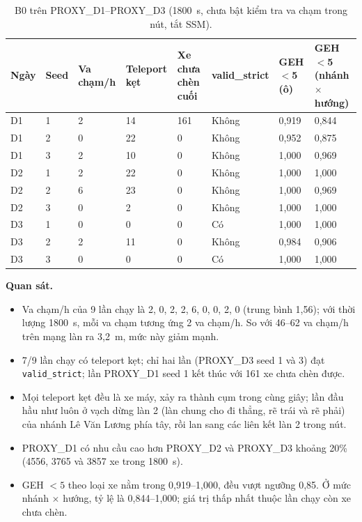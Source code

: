 \documentclass[../DoAn.tex]{subfiles}
\begin{document}
\begin{table}[H]
\centering
\small\setlength{\tabcolsep}{3pt}
\caption{B0 trên PROXY\_D1--PROXY\_D3 (1800~s, chưa bật kiểm tra va chạm trong nút, tắt SSM).}
\label{table:4.b0}
\begin{tabular}{|p{1.3cm}|p{0.9cm}|p{1.5cm}|p{1.6cm}|p{1.8cm}|p{1.8cm}|p{1.6cm}|p{1.7cm}|}
\hline
\textbf{Ngày} & \textbf{Seed} & \textbf{Va chạm/h} & \textbf{Teleport kẹt} & \textbf{Xe chưa chèn cuối} & \textbf{valid\_\allowbreak strict} & \textbf{GEH$<$5 (ô)} & \textbf{GEH$<$5 (nhánh $\times$ hướng)} \\ \hline
D1 & 1 & 2 & 14 & 161 & Không & 0,919 & 0,844 \\ \hline
D1 & 2 & 0 & 22 & 0 & Không & 0,952 & 0,875 \\ \hline
D1 & 3 & 2 & 10 & 0 & Không & 1,000 & 0,969 \\ \hline
D2 & 1 & 2 & 22 & 0 & Không & 1,000 & 1,000 \\ \hline
D2 & 2 & 6 & 23 & 0 & Không & 1,000 & 0,969 \\ \hline
D2 & 3 & 0 & 2 & 0 & Không & 1,000 & 1,000 \\ \hline
D3 & 1 & 0 & 0 & 0 & Có & 1,000 & 1,000 \\ \hline
D3 & 2 & 2 & 11 & 0 & Không & 0,984 & 0,906 \\ \hline
D3 & 3 & 0 & 0 & 0 & Có & 1,000 & 1,000 \\ \hline
\end{tabular}
\end{table}

\textbf{Quan sát.}
\begin{itemize}
    \item Va chạm/h của 9 lần chạy là 2, 0, 2, 2, 6, 0, 0, 2, 0 (trung bình 1,56); với thời lượng 1800~s, mỗi va chạm tương ứng 2 va chạm/h. So với 46--62 va chạm/h trên mạng làn ra 3,2~m, mức này giảm mạnh.
    \item 7/9 lần chạy có teleport kẹt; chỉ hai lần (PROXY\_D3 seed 1 và 3) đạt \texttt{valid\_strict}; lần PROXY\_D1 seed 1 kết thúc với 161 xe chưa chèn được.
    \item Mọi teleport kẹt đều là xe máy, xảy ra thành cụm trong cùng giây; lần đầu hầu như luôn ở vạch dừng làn 2 (làn chung cho đi thẳng, rẽ trái và rẽ phải) của nhánh Lê Văn Lương phía tây, rồi lan sang các liên kết làn 2 trong nút.
    \item PROXY\_D1 có nhu cầu cao hơn PROXY\_D2 và PROXY\_D3 khoảng 20\% (4556, 3765 và 3857 xe trong 1800~s).
    \item GEH $<5$ theo loại xe nằm trong 0,919--1,000, đều vượt ngưỡng 0,85. Ở mức nhánh $\times$ hướng, tỷ lệ là 0,844--1,000; giá trị thấp nhất thuộc lần chạy còn xe chưa chèn.
\end{itemize}
\end{document}
